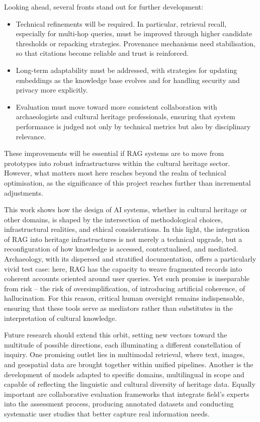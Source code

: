 \begin{spacing}{1.5}
Looking ahead, several fronts stand out for further development:
\begin{itemize}
    \item Technical refinements will be required. In particular, retrieval recall, especially for multi-hop queries, must be improved through higher candidate thresholds or repacking strategies. Provenance mechanisms need stabilisation, so that citations become reliable and trust is reinforced. 
    \item Long-term adaptability must be addressed, with strategies for updating embeddings as the knowledge base evolves and for handling security and privacy more explicitly.
    \item Evaluation must move toward more consistent collaboration with archaeologists and cultural heritage professionals, ensuring that system performance is judged not only by technical metrics but also by disciplinary relevance.
\end{itemize}

These improvements will be essential if RAG systems are to move from prototypes into robust infrastructures within the cultural heritage sector. However, what matters most here reaches beyond the realm of technical optimisation, as the significance of this project reaches further than incremental adjustments. 

This work shows how the design of AI systems, whether in cultural heritage or other domains, is shaped by the intersection of methodological choices, infrastructural realities, and ethical considerations. In this light, the integration of RAG into heritage infrastructures is not merely a technical upgrade, but a reconfiguration of how knowledge is accessed, contextualised, and mediated. Archaeology, with its dispersed and stratified documentation, offers a particularly vivid test case: here, RAG has the capacity to weave fragmented records into coherent accounts oriented around user queries. Yet such promise is inseparable from risk -- the risk of oversimplification, of introducing artificial coherence, of hallucination. For this reason, critical human oversight remains indispensable, ensuring that these tools serve as mediators rather than substitutes in the interpretation of cultural knowledge.

Future research should extend this orbit, setting new vectors toward the multitude of possible directions, each illuminating a different constellation of inquiry. One promising outlet lies in multimodal retrieval, where text, images, and geospatial data are brought together within unified pipelines. Another is the development of models adapted to specific domains, multilingual in scope and capable of reflecting the linguistic and cultural diversity of heritage data. Equally important are collaborative evaluation frameworks that integrate field's experts into the assessment process, producing annotated datasets and conducting systematic user studies that better capture real information needs.


\end{spacing}
